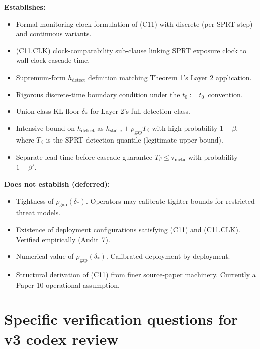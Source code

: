 \documentclass{article}
\newcommand{\deltastar}{\delta_{*}}
\newcommand{\rhogap}{\rho_{\mathrm{gap}}}
\newcommand{\Tbeta}{T_{\beta}}
\begin{document}
\textbf{Establishes:}
\begin{itemize}
\item Formal monitoring-clock formulation of (C11) with discrete
  (per-SPRT-step) and continuous variants.
\item (C11.CLK) clock-comparability sub-clause linking SPRT
  exposure clock to wall-clock cascade time.
\item Supremum-form $h_{\mathrm{detect}}$ definition matching
  Theorem 1's Layer 2 application.
\item Rigorous discrete-time boundary condition under the
  $t_0 := t_0^-$ convention.
\item Union-class KL floor $\deltastar$ for Layer 2's full
  detection class.
\item Intensive bound on $h_{\mathrm{detect}}$ as $h_{\mathrm{static}}
  + \rhogap \Tbeta$ with high probability $1-\beta$, where
  $\Tbeta$ is the SPRT detection quantile (legitimate upper
  bound).
\item Separate lead-time-before-cascade guarantee $\Tbeta \leq
  \tau_{\mathrm{meta}}$ with probability $1-\beta'$.
\end{itemize}

\textbf{Does not establish (deferred):}
\begin{itemize}
\item Tightness of $\rhogap(\deltastar)$.  Operators may calibrate
  tighter bounds for restricted threat models.
\item Existence of deployment configurations satisfying (C11) and
  (C11.CLK).  Verified empirically (Audit~7).
\item Numerical value of $\rhogap(\deltastar)$.  Calibrated
  deployment-by-deployment.
\item Structural derivation of (C11) from finer source-paper
  machinery.  Currently a Paper 10 operational assumption.
\end{itemize}

\section{Specific verification questions for v3 codex review}
\end{document}
